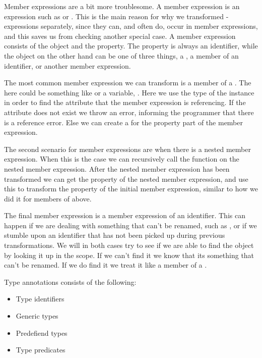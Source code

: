 Member expressions are a bit more troublesome.
A member expression is an expression such as  or .
This is the main reason for why we transformed -expressions separately, since they can, and often do, occur in member expressions, and this saves us from checking another special case.
A member expression consists of the object and the property.
The property is always an identifier, while the object on the other hand can be one of three things, a , a member of an identifier, or another member expression.

The most common member expression we can transform is a member of a .
The  here could be something like  or a variable, .
Here we use the type of the  instance in order to find the attribute that the member expression is referencing.
If the attribute does not exist we throw an error, informing the programmer that there is a reference error.
Else we can create a  for the property part of the member expression.

The second scenario for member expressions are when there is a nested member expression.
When this is the case we can recursively call the function on the nested member expression.
After the nested member expression has been transformed we can get the property of the nested member expression, and use this to transform the property of the initial member expression, similar to how we did it for members of  above.

The final member expression is a member expression of an identifier.
This can happen if we are dealing with something that can't be renamed, such as , or if we stumble upon an identifier that has not been picked up during previous transformations.
We will in both cases try to see if we are able to find the object by looking it up in the scope.
If we can't find it we know that its something that can't be renamed.
If we do find it we treat it like a member of a .

Type annotations consists of the following:

\begin{itemize}
    \item Type identifiers
    \item Generic types
    \item Predefiend types
    \item Type predicates
\end{itemize}

